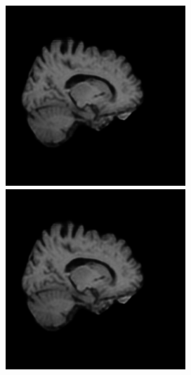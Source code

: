 \documentclass[12pt, fleqn, titlepage]{article}
\newcommand\skipperer{0.45pt}
\begin{document}
\begin{figure}[H]
\begin{subfigure}[b]{0.7\textwidth}
		\hskip\skipperer
		\includegraphics[width=0.15\linewidth]{imgs/3T_no_noise}
		\hskip\skipperer
		\includegraphics[width=0.15\linewidth]{imgs/3T_no_noise}
	\end{subfigure}
\end{figure}
\end{document}
